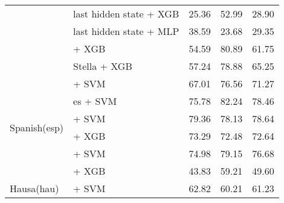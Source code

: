\begin{longtable}{llccc}
                                          & \citep{DBLP:journals/corr/abs-1911-02116} last hidden state + XGB  & 25.36                                & 52.99              & 28.90             \\
                                          & \citep{DBLP:journals/corr/abs-1911-02116} last hidden state + MLP  & 38.59                                & 23.68              & 29.35             \\
                                          & \citep{lee2024nv} + XGB                                            & 54.59                                & 80.89              & 61.75             \\
                                          & \citep{zhang2025jasperstelladistillationsota} Stella + XGB         & 57.24                                & 78.88              & 65.25             \\
    \midrule
    \multirow{6}{*}{Spanish(esp)}         & \citep{CaneteCFP2020}  + SVM                                       & 67.01                                & 76.56              & 71.27             \\
                                          & \citep{mohr2024multi} es + SVM                                     & 75.78                                & 82.24              & 78.46             \\
                                          & \citep{sturua2024jinaembeddingsv3multilingualembeddingstask} + SVM & 79.36                                & 78.13              & 78.64             \\
                                          & \citep{sturua2024jinaembeddingsv3multilingualembeddingstask} + XGB & 73.29                                & 72.48              & 72.64             \\
                                          & \citep{romero2023multilinguale5largeftstsspanish} + SVM            & 74.98                                & 79.15              & 76.68             \\
                                          & \citep{all-MiniLM-L12-v2} + XGB                                    & 43.83                                & 59.21              & 49.60             \\
    \midrule
    \multirow{6}{*}{Hausa(hau)}           & \citep{wang2024multilingual}  + SVM                                & 62.82                                & 60.21              & 61.23             \\

\end{longtable}
